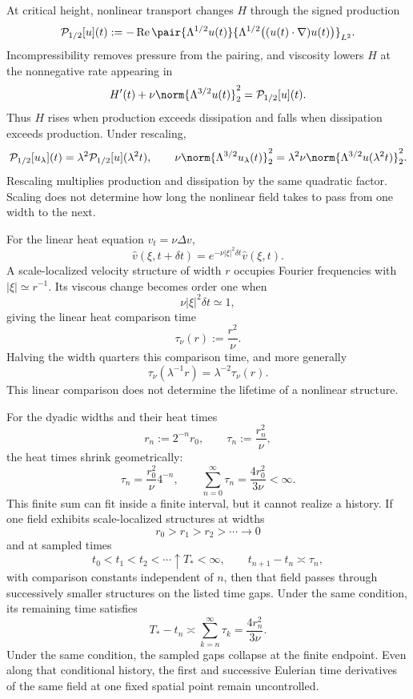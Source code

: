 At critical height, nonlinear transport changes \(H\) through the signed production
\[
  \mathcal P_{1/2}[u](t)
  :=
  -\operatorname{Re}
  \pair
    {\Lambda^{1/2}u(t)}
    {\Lambda^{1/2}\bigl((u(t)\cdot\nabla)u(t)\bigr)}_{L^2}.
\]
Incompressibility removes pressure from the pairing, and viscosity lowers \(H\) at the nonnegative rate appearing in
\[
  H'(t)
  +
  \nu\norm{\Lambda^{3/2}u(t)}_2^2
  =
  \mathcal P_{1/2}[u](t).
\]
Thus \(H\) rises when production exceeds dissipation and falls when dissipation exceeds production. Under rescaling,
\[
  \mathcal P_{1/2}[u_\lambda](t)
  =
  \lambda^2\mathcal P_{1/2}[u](\lambda^2t),
  \qquad
  \nu\norm{\Lambda^{3/2}u_\lambda(t)}_2^2
  =
  \lambda^2\nu\norm{\Lambda^{3/2}u(\lambda^2t)}_2^2.
\]
Rescaling multiplies production and dissipation by the same quadratic factor. Scaling does not determine how long the nonlinear field takes to pass from one width to the next.


For the linear heat equation \(v_t=\nu\Delta v\),
\[
  \widehat v(\xi,t+\delta t)
  =
  e^{-\nu|\xi|^2\delta t}\widehat v(\xi,t).
\]
A scale-localized velocity structure of width \(r\) occupies Fourier frequencies with \(|\xi|\simeq r^{-1}\). Its viscous change becomes order one when
\[
  \nu|\xi|^2\delta t\simeq1,
\]
giving the linear heat comparison time
\[
  \tau_\nu(r)
  :=
  \frac{r^2}{\nu}.
\]
Halving the width quarters this comparison time, and more generally
\[
  \tau_\nu(\lambda^{-1}r)
  =
  \lambda^{-2}\tau_\nu(r).
\]
This linear comparison does not determine the lifetime of a nonlinear structure.


For the dyadic widths and their heat times
\[
  r_n:=2^{-n}r_0,
  \qquad
  \tau_n:=\frac{r_n^2}{\nu},
\]
the heat times shrink geometrically:
\[
  \tau_n
  =
  \frac{r_0^2}{\nu}4^{-n},
  \qquad
  \sum_{n=0}^{\infty}\tau_n
  =
  \frac{4r_0^2}{3\nu}
  <
  \infty.
\]
This finite sum can fit inside a finite interval, but it cannot realize a history. If one \NavierStokes{} field exhibits scale-localized structures at widths
\[
  r_0>r_1>r_2>\cdots\longrightarrow0
\]
and at sampled times
\[
  t_0<t_1<t_2<\cdots\uparrow T_*<\infty,
  \qquad
  t_{n+1}-t_n\asymp\tau_n,
\]
with comparison constants independent of \(n\), then that field passes through successively smaller structures on the listed time gaps. Under the same condition, its remaining time satisfies
\[
  T_*-t_n
  \asymp
  \sum_{k=n}^{\infty}\tau_k
  =
  \frac{4r_n^2}{3\nu}.
\]
Under the same condition, the sampled gaps collapse at the finite endpoint. Even along that conditional history, the first and successive Eulerian time derivatives of the same field at one fixed spatial point remain uncontrolled.
